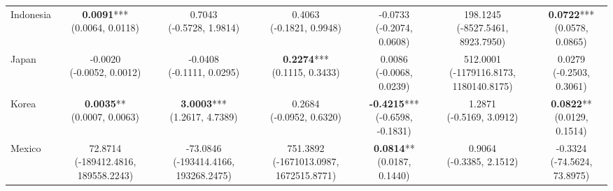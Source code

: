 \begin{table}[htbp]
{\begin{tabular}{l|cccccc}
Indonesia            & \makecell{\textbf{0.0091}*** \\ \scriptsize{(0.0064, 0.0118)}} & \makecell{0.7043 \\ \scriptsize{(-0.5728, 1.9814)}} & \makecell{0.4063 \\ \scriptsize{(-0.1821, 0.9948)}} & \makecell{-0.0733 \\ \scriptsize{(-0.2074, 0.0608)}} & \makecell{198.1245 \\ \scriptsize{(-8527.5461, 8923.7950)}} & \makecell{\textbf{0.0722}*** \\ \scriptsize{(0.0578, 0.0865)}} \\
Japan                & \makecell{-0.0020 \\ \scriptsize{(-0.0052, 0.0012)}} & \makecell{-0.0408 \\ \scriptsize{(-0.1111, 0.0295)}} & \makecell{\textbf{0.2274}*** \\ \scriptsize{(0.1115, 0.3433)}} & \makecell{0.0086 \\ \scriptsize{(-0.0068, 0.0239)}} & \makecell{512.0001 \\ \scriptsize{(-1179116.8173, 1180140.8175)}} & \makecell{0.0279 \\ \scriptsize{(-0.2503, 0.3061)}} \\
Korea                & \makecell{\textbf{0.0035}** \\ \scriptsize{(0.0007, 0.0063)}} & \makecell{\textbf{3.0003}*** \\ \scriptsize{(1.2617, 4.7389)}} & \makecell{0.2684 \\ \scriptsize{(-0.0952, 0.6320)}} & \makecell{\textbf{-0.4215}*** \\ \scriptsize{(-0.6598, -0.1831)}} & \makecell{1.2871 \\ \scriptsize{(-0.5169, 3.0912)}} & \makecell{\textbf{0.0822}** \\ \scriptsize{(0.0129, 0.1514)}} \\
Mexico               & \makecell{72.8714 \\ \scriptsize{(-189412.4816, 189558.2243)}} & \makecell{-73.0846 \\ \scriptsize{(-193414.4166, 193268.2475)}} & \makecell{751.3892 \\ \scriptsize{(-1671013.0987, 1672515.8771)}} & \makecell{\textbf{0.0814}** \\ \scriptsize{(0.0187, 0.1440)}} & \makecell{0.9064 \\ \scriptsize{(-0.3385, 2.1512)}} & \makecell{-0.3324 \\ \scriptsize{(-74.5624, 73.8975)}} \\

\end{tabular}}
\end{table}
